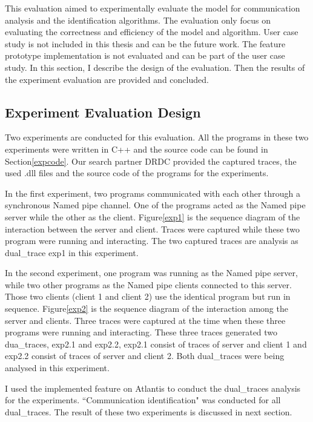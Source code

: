 

\label{chapter:Exp}
This evaluation aimed to experimentally evaluate the model for communication analysis and the identification algorithms. The evaluation only focus on evaluating the correctness and efficiency of the model and algorithm. User case study is not included in this thesis and can be the future work. The feature prototype implementation is not evaluated and can be part of the user case study. In this section, I describe the design of the evaluation.  Then the results of the experiment evaluation are provided and concluded.

\subsection{Experiment Evaluation Design}
Two experiments are conducted for this evaluation.  All the programs in these two experiments were written in C++ and the source code can be found in Section\ref{expcode}. Our search partner DRDC provided the captured traces, the used .dll files and  the source code of the programs for the experiments.

In the first experiment, two programs communicated with each other through a synchronous Named pipe channel. One of the programs acted as the Named pipe server while the other as the client. Figure\ref{exp1} is the sequence diagram of the interaction between the server and client. Traces were captured while these two program were running and interacting. The two captured traces are analysis as dual\_trace exp1 in this experiment. 

In the second experiment, one program was running as the Named pipe server, while two other programs as the Named pipe clients connected to this server. Those two clients (client 1 and client 2) use the identical program but run in sequence. Figure\ref{exp2} is the sequence diagram of  the interaction among the server and clients. Three traces were captured at the time when these three programs were running and interacting. These three traces generated two dua\_traces, exp2.1 and exp2.2, exp2.1 consist of traces of server and client 1 and exp2.2 consist of traces of server and client 2. Both dual\_traces were being analysed in this experiment.

I used the implemented feature on Atlantis to conduct the dual\_traces analysis for the experiments. ``Communication identification" was conducted for all dual\_traces. The result of these two experiments is discussed in next section. 

